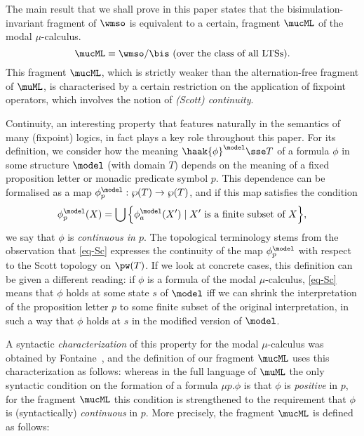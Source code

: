 The main result that we shall prove in this paper states that the
bisimulation-invariant fragment of $\wmso$ is equivalent to a certain,
fragment $\mucML$ of the modal $\mu$-calculus.
\begin{equation}
\label{eq-main}
\mucML \equiv \wmso/{\bis}  \text{ (over the class of all LTSs)}.
\end{equation}
This fragment $\mucML$, which is strictly weaker than the alternation-free fragment
of $\muML$, is characterised by a certain restriction on the application of
fixpoint operators, which involves the notion of \emph{(Scott) continuity}.

Continuity, an interesting property that features naturally in the semantics
of many (fixpoint) logics, in fact plays a key role throughout this paper.
For its definition, we consider how the meaning $\haak{\phi}^{\model} \sse T$
of a formula $\phi$ in some structure $\model$ (with domain $T$) depends on the meaning of a fixed
proposition letter or monadic predicate symbol $p$.
This dependence can be formalised as a map $\phi^{\model}_{p}: \wp(T) \to
\wp (T)$, and if this map satisfies the condition
\begin{equation}
\label{eq-Sc}
\phi^{\model}_{p}(X) = \bigcup \Big\{ \phi^{\model}_{a}(X') \mid X'
\text{ is a finite subset of } X \Big\},
\end{equation}
we say that $\phi$ is \emph{continuous in $p$}.
The topological terminology stems from the observation that \eqref{eq-Sc}
expresses the continuity of the map $\phi^{\model}_{p}$ with respect to the Scott
topology on $\pw(T)$. %
If we look at concrete cases, this definition can be given a different reading:
if $\phi$ is a formula of the
modal $\mu$-calculus, \eqref{eq-Sc} means that $\phi$ holds at some state $s$
of $\model$ iff we can shrink the interpretation of the proposition letter $p$
to some finite subset of the original interpretation, in such a way that
$\phi$ holds at $s$ in the modified version of $\model$.


A syntactic \emph{characterization} of this property for the modal $\mu$-calculus
was obtained by Fontaine~\cite{Fontaine08,FV12}, and the definition of our fragment $\mucML$
uses this characterization as follows:
whereas in the full language of $\muML$ the only syntactic condition on the
formation of a formula $\mu p. \phi$ is that $\phi$ is \emph{positive} in $p$,
for the fragment $\mucML$ this condition is strengthened to the requirement that
$\phi$ is (syntactically) \emph{continuous} in $p$.
More precisely, the fragment $\mucML$ is defined as follows:

